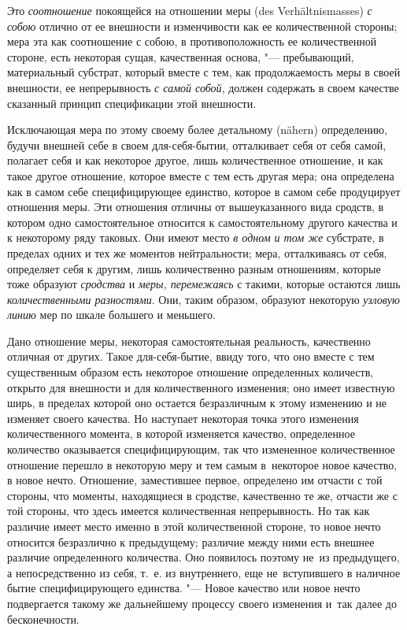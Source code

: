 Это {\em соотношение} покоящейся на отношении меры (des Ver\-hält\-nis\-masses)
{\em с собою} отлично от ее внешности и изменчивости как ее количественной
стороны; мера эта как соотношение с собою, в противоположность ее
количественной стороне, есть некоторая сущая, качественная основа, "---
пребывающий, материальный субстрат, который вместе с тем, как продолжаемость
меры в своей внешности, ее непрерывность {\em с самой собой}, должен содержать
в своем качестве сказанный принцип спецификации этой внешности.

Исключающая мера по этому своему более детальному (nähern) определению, будучи
внешней себе в своем для-себя-бытии, отталкивает себя от себя самой, полагает
себя и как некоторое другое, лишь количественное отношение, и как такое другое
отношение, которое вместе с тем есть другая мера; она определена как в самом
себе специфицирующее единство, которое в самом себе продуцирует отношения меры.
Эти отношения отличны от вышеуказанного вида сродств, в котором одно
самостоятельное относится к самостоятельному другого качества и к некоторому
ряду таковых. Они имеют место {\em в одном и том же} субстрате, в пределах
одних и тех же моментов нейтральности; мера, отталкиваясь от себя, определяет
себя к другим, лишь количественно разным отношениям, которые тоже образуют
{\em сродства} и {\em меры, перемежаясь} с такими, которые остаются лишь
{\em количественными разностями}. Они, таким образом, образуют некоторую
{\em узловую линию} мер по шкале большего и меньшего.

Дано отношение меры, некоторая самостоятельная реальность, качественно отличная
от других. Такое для-себя-бытие, ввиду того, что оно вместе с тем существенным
образом есть некоторое отношение определенных количеств, открыто для внешности
и для количественного изменения; оно имеет известную ширь, в пределах которой
оно остается безразличным к этому изменению и не изменяет своего качества. Но
наступает некоторая точка этого изменения количественного момента, в которой
изменяется качество, определенное количество оказывается специфицирующим, так
что измененное количественное отношение перешло в некоторую меру и тем самым
в~некоторое новое качество, в новое нечто. Отношение, заместившее первое,
определено им отчасти с той стороны, что моменты, находящиеся в сродстве,
качественно те же, отчасти же с той стороны, что здесь имеется количественная
непрерывность. Но так как различие имеет место именно в этой количественной
стороне, то новое нечто относится безразлично к предыдущему; различие между
ними есть внешнее различие определенного количества. Оно появилось поэтому
не~из предыдущего, а непосредственно из себя, т.~е. из внутреннего, еще
не~вступившего в наличное бытие специфицирующего единства. "--- Новое качество
или новое нечто подвергается такому же дальнейшему процессу своего изменения
и~так далее до бесконечности.

